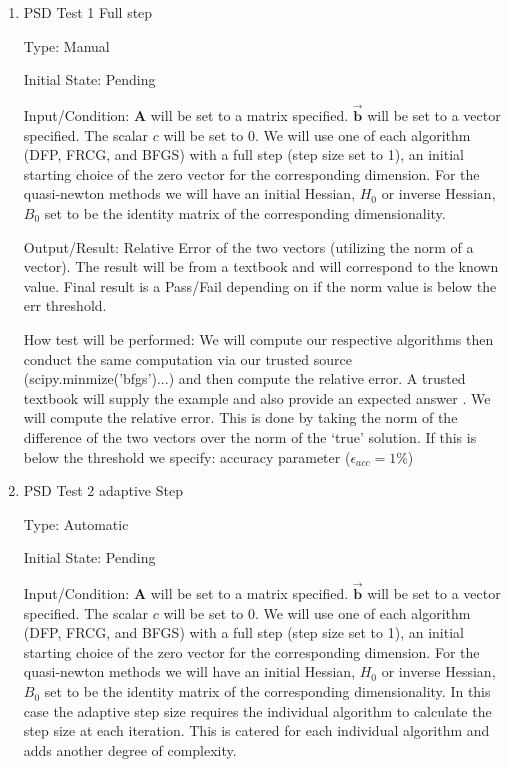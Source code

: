 \documentclass[12pt, titlepage]{article}
\begin{document}
\begin{enumerate}

\item{PSD Test 1 Full step}\

Type: Manual 
					
Initial State: Pending
					
Input/Condition: $\mathbf{A}$ will be set to a matrix specified.
$\mathbf{\vec{b}}$ will be set to a vector specified. The scalar $c$ will be set to 0. We will
use one of each algorithm (DFP, FRCG, and BFGS) with a full step (step size set to 1),
an initial starting choice of the zero vector for the corresponding dimension. For the 
quasi-newton methods we will have an initial Hessian, $H_{0}$ or inverse Hessian, $B_{0}$ set to be the identity 
matrix of the corresponding dimensionality. 
					
Output/Result: Relative Error of the two vectors (utilizing the norm of a vector). The result will be from a textbook and will correspond to the known value. Final result is a Pass/Fail depending on if the norm value is below the err threshold.
					
How test will be performed: We will compute our respective algorithms then conduct the same 
computation via our trusted source (scipy.minmize('bfgs')...) and then compute the relative 
error. A trusted textbook will supply the example and also provide an expected answer \citep{Boyd2006}. We will compute the relative error. This is done by taking the norm of the difference of the two vectors over the norm of
the `true' solution. If this is below the threshold we specify: accuracy parameter ($\epsilon_{acc} = 1\%$) 


\item{PSD Test 2 adaptive Step}\

Type: Automatic
					
Initial State: Pending
					
Input/Condition: $\mathbf{A}$ will be set to a matrix specified.
$\mathbf{\vec{b}}$ will be set to a vector specified. The scalar $c$ will be set to 0. We will
use one of each algorithm (DFP, FRCG, and BFGS) with a full step (step size set to 1),
an initial starting choice of the zero vector for the corresponding dimension. For the 
quasi-newton methods we will have an initial Hessian, $H_{0}$ or inverse Hessian, $B_{0}$ set to be the identity 
matrix of the corresponding dimensionality. In this case the adaptive step size requires 
the individual algorithm to calculate the step size at each iteration. This is catered for 
each individual algorithm and adds another degree of complexity.
					

\end{enumerate}
\end{document}
